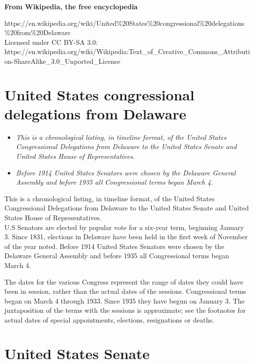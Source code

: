 \textbf{From Wikipedia, the free encyclopedia}

https://en.wikipedia.org/wiki/United\%20States\%20congressional\%20delegations\%20from\%20Delaware\\
Licensed under CC BY-SA 3.0:\\
https://en.wikipedia.org/wiki/Wikipedia:Text\_of\_Creative\_Commons\_Attribution-ShareAlike\_3.0\_Unported\_License

\section{United States congressional delegations from
Delaware}\label{united-states-congressional-delegations-from-delaware}

\begin{itemize}
\item
  \emph{This is a chronological listing, in timeline format, of the
  United States Congressional Delegations from Delaware to the United
  States Senate and United States House of Representatives.}
\item
  \emph{Before 1914 United States Senators were chosen by the Delaware
  General Assembly and before 1935 all Congressional terms began March
  4.}
\end{itemize}

This is a chronological listing, in timeline format, of the United
States Congressional Delegations from Delaware to the United States
Senate and United States House of Representatives.\\
U.S Senators are elected by popular vote for a six-year term, beginning
January 3. Since 1831, elections in Delaware have been held in the first
week of November of the year noted. Before 1914 United States Senators
were chosen by the Delaware General Assembly and before 1935 all
Congressional terms began March 4.

The dates for the various Congress represent the range of dates they
could have been in session, rather than the actual dates of the
sessions. Congressional terms began on March 4 through 1933. Since 1935
they have begun on January 3. The juxtaposition of the terms with the
sessions is approximate; see the footnotes for actual dates of special
appointments, elections, resignations or deaths.

\section{United States Senate}\label{united-states-senate}


